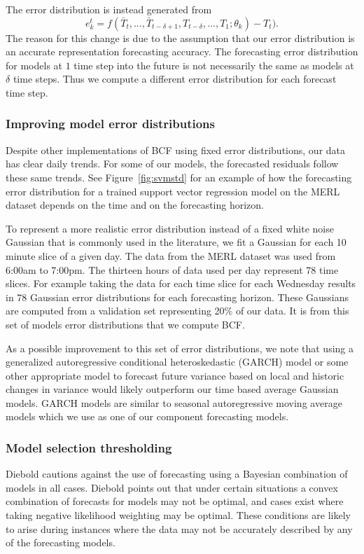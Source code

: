 \documentclass{acm_proc_article-sp}
\begin{document}
The error distribution is instead generated from 
\begin{equation}
e^{t}_{k} = f(\bar{T}_{t}, ..., \bar{T}_{t - \delta + 1}, T_{t - \delta}, ..., T_{1};\theta_{k}) - T_{t}).
\end{equation}
The reason for this change is due to the assumption that our error distribution is an accurate representation forecasting accuracy.  
The forecasting error distribution for models at $1$ time step into the future is not necessarily the same as models at $\delta$ time steps.  Thus we compute a different error distribution for each forecast time step.


\subsubsection{Improving model error distributions}
Despite other implementations of BCF using fixed error distributions, our data has clear daily trends.  For some of our models, the forecasted residuals follow these same trends.  See Figure~\ref{fig:svmstd} for an example of how the forecasting error distribution for a trained support vector regression model on the MERL dataset depends on the time and on the forecasting horizon.

To represent a more realistic error distribution instead of a fixed white noise Gaussian that is commonly used in the literature, we fit a Gaussian for each 10 minute slice of a given day.  The data from the MERL dataset was used from 6:00am to 7:00pm. The thirteen hours of data used per day represent 78 time slices.  For example taking the data for each time slice for each Wednesday results in 78 Gaussian error distributions for each forecasting horizon.  These Gaussians are computed from a validation set representing 20\% of our data.  It is from this set of models error distributions that we compute BCF.

As a possible improvement to this set of error distributions, we note that using a generalized autoregressive conditional heteroskedastic (GARCH) model \cite{Box2008} or some other appropriate model to forecast future variance based on local and historic changes in variance would likely outperform our time based average Gaussian models.  GARCH models are similar to seasonal autoregressive moving average models which we use as one of our component forecasting models.

\subsubsection{Model selection thresholding}
Diebold \cite{Diebold1991} cautions against the use of forecasting using a Bayesian combination of models in all cases.  Diebold points out that under certain situations a convex combination of forecasts for models may not be optimal, and cases exist where taking negative likelihood weighting may be optimal.  These conditions are likely to arise during instances where the data may not be accurately described by any of the forecasting models.  
\end{document}
